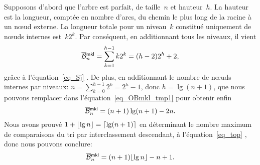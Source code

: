 Supposons d'abord que l'arbre est parfait, de taille~\(n\) et
hauteur~\(h\). La hauteur est la
longueur, comptée en nombre d'arcs, du chemin le plus long de la
racine à un n{\oe}ud externe. La longueur totale pour un niveau~\(k\)
constitué uniquement de n{\oe}uds internes est~\(k2^k\). Par
conséquent, en additionnant tous les niveaux, il vient
\begin{equation}
\OB{\fun{mkl}}{n} = \sum_{k=1}^{h-1}k2^k = (h-2)2^h + 2,
\label{eq_OBmkl_tmp1}
\end{equation}
grâce à l'équation~\eqref{eq_Sj} . De plus, en
additionnant le nombre de n{\oe}uds internes par niveaux: \(n =
\sum_{k=0}^{h-1}2^k = 2^{h} - 1\), donc \(h = \lg(n+1)\), que nous
pouvons remplacer dans l'équation~\eqref{eq_OBmkl_tmp1} pour obtenir
enfin
\begin{equation*}
\OB{\fun{mkl}}{n} = (n+1)\lg(n+1) - 2n.
\end{equation*}
Nous avons prouvé \(1 + \lfloor{\lg n}\rfloor = \lceil{\lg(n+1)}\rceil\) en
déterminant le nombre maximum de comparaisons du tri par
interclassement descendant, à l'équation~\eqref{eq_top}
, donc nous pouvons conclure:
\begin{equation}
\OB{\fun{mkl}}{n} = (n+1)\floor{\lg n} - n + 1.
\index{mkl@$\OB{\fun{mkl}}{n}$}
\label{eq_OBmkl_perfect}
\end{equation}


